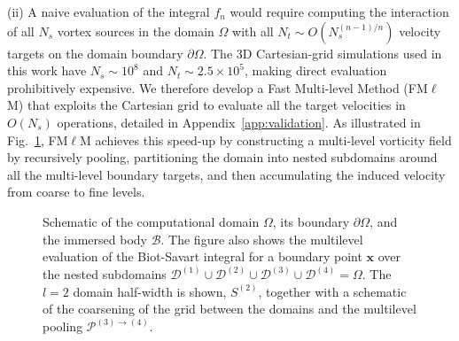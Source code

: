 \documentclass[lineno]{JFM-FLM_Au}
\begin{document}


(ii) A naive evaluation of the integral $f_n$ 
would require computing the interaction of all $N_s$ vortex sources in the domain $\Omega$ with all $N_t\sim O(N_s^{(n-1)/n})$ velocity targets on the domain boundary $\partial\Omega$. The 3D Cartesian-grid simulations used in this work have $N_s \sim 10^8$ and $N_t\sim 2.5\times 10^5$, making direct evaluation prohibitively expensive. 
We therefore develop a Fast Multi-level Method (FM$\ell$M) that exploits the Cartesian grid to evaluate all the target velocities in $O(N_s)$ operations, detailed in Appendix~\ref{app:validation}. As illustrated in Fig.~\ref{Fig_2}, FM$\ell$M achieves this speed-up by constructing a multi-level vorticity field by recursively pooling, partitioning the domain into nested subdomains around all the multi-level boundary targets, and then accumulating the induced velocity from coarse to fine levels. 

\begin{figure}
    \centering
    \vspace{2mm}
    \def\svgwidth{0.6\columnwidth}
    
    \caption{Schematic of the computational domain $\Omega$, its boundary $\partial\Omega$, and the immersed body $\mathcal{B}$. The figure also shows the multilevel evaluation of the Biot-Savart integral for a boundary point $\bm x$ over the nested subdomains $\mathcal{D}^{(1)} \cup \mathcal{D}^{(2)} \cup \mathcal{D}^{(3)} \cup \mathcal{D}^{(4)}=\Omega $. The $l=2$ domain half-width is shown, ${S}^{(2)}$, together with a schematic of the coarsening of the grid between the domains and the multilevel pooling $\mathcal{P}^{(3)\to(4)}$.}
    \label{Fig_2}
\end{figure}
\end{document}
